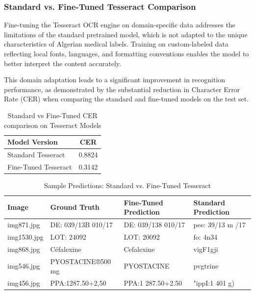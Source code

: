 \subsubsection{Standard vs. Fine-Tuned Tesseract Comparison}

Fine-tuning the Tesseract OCR engine on domain-specific data addresses the limitations of the standard pretrained model, which is not adapted to the unique characteristics of Algerian medical labels. Training on custom-labeled data reflecting local fonts, languages, and formatting conventions enables the model to better interpret the content accurately.

This domain adaptation leads to a significant improvement in recognition performance, as demonstrated by the substantial reduction in Character Error Rate (CER) when comparing the standard and fine-tuned models on the test set.

\vspace{0.5cm}
\begin{table}[H]
\caption{ Standard vs Fine-Tuned CER comparison on Tesseract Models}
\centering
\begin{tabular}{lc}
\hline
\textbf{Model Version} & \textbf{CER } \\
\hline
Standard Tesseract & 0.8824 \\
Fine-Tuned Tesseract & 0.3142 \\
\hline
\end{tabular}

\label{tab:Tesseract-cer-comparison}
\end{table}

\vspace{0.5cm}
\begin{table}[H]
\caption{Sample Predictions: Standard vs. Fine-Tuned Tesseract}
\centering
\begin{tabular}{llll}
\hline
\textbf{Image} & \textbf{Ground Truth} & \textbf{Fine-Tuned Prediction} & \textbf{Standard Prediction} \\
\hline
img871.jpg & DE: 039/13B 010/17 & DE: 039/138 010/17 & pee: 39/13 m /17 \\
img1530.jpg & LOT: 24092 & LOT: 20092 & fo: 4n34 \\
img868.jpg & Céfalexine & Cefalexine & vigF1gji \\
img546.jpg & PYOSTACINE®500 mg & PYOSTACINE & pvgtrine \\
img456.jpg & PPA:1287.50+2,50 & PPA:1 287.50+2.50 & "ippI:1 401 g) \\
\hline
\end{tabular}

\label{tab:tesseract-sample-predictions}
\end{table}

